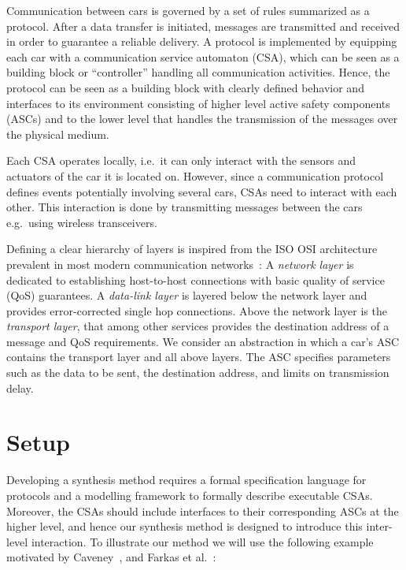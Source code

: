 \documentclass{sig-alternate}
\begin{document}
Communication between cars is governed by a set of rules summarized as a protocol. After a data transfer is initiated, messages are transmitted and received in order to guarantee a reliable delivery. A protocol is implemented by equipping each car with a communication service automaton (CSA), which can be seen as a building block or ``controller'' handling all communication activities. Hence, the protocol can be seen as a building block with clearly defined behavior and interfaces to its environment consisting of higher level active safety components (ASCs) and to the lower level that handles the transmission of the messages over the physical medium.

Each CSA operates locally, i.e.\ it can only interact with the sensors and actuators of the car it is located on. However, since a communication protocol defines events potentially involving several cars, CSAs need to interact with each other. This interaction is done by transmitting messages between the cars e.g.\ using wireless transceivers.

Defining a clear hierarchy of layers is inspired from the ISO OSI architecture prevalent in most modern communication networks~\cite{ISOOSI}: A \emph{network layer} is dedicated to establishing host-to-host connections with basic quality of service (QoS) guarantees. A \emph{data-link layer} is layered below the network layer and provides error-corrected single hop connections. Above the network layer is the \emph{transport layer}, that among other services provides the destination address of a message and QoS requirements. We consider an abstraction in which a car's ASC contains the transport layer and all above layers. The ASC specifies parameters such as the data to be sent, the destination address, and limits on transmission delay.


 

\vspace{-.06in}



\section{Setup} \label{sec:preliminaries}

Developing a synthesis method requires a formal specification language for protocols and a modelling framework to formally describe executable CSAs. Moreover, the CSAs should include interfaces to their corresponding ASCs at the higher level, and hence our synthesis method is designed to introduce this inter-level interaction. To illustrate our method we will use the following example motivated by Caveney~\cite{Caveney}, and Farkas et al.\ \cite{VComm}:
\end{document}
